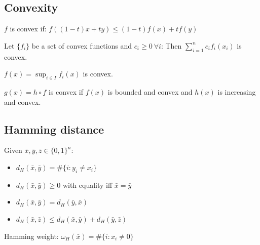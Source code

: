 \documentclass[10pt,a4paper,landscape]{article}
\begin{document}
\begin{multicols*}{4}
\subsection{Convexity}

$f$ is convex if: $f((1-t)x+ t y)\leq (1-t) f(x)+ t f(y)$

Let $\{f_i\}$ be a set of convex functions and $c_i \geq 0 \ \forall i$:
Then $\sum_{i=1}^n c_i f_i(x_i)$ is convex.

$f(x) = \sup_{i \in I} f_i(x)$ is convex.

$g(x) = h \circ f$ is convex if $f(x)$ is bounded and convex and $h(x)$ is increasing and convex.


\subsection{Hamming distance}
Given $\bar{x}, \bar{y}, \bar{z} \in \{0,1\}^n$:
\begin{itemize}
 \item $d_H(\bar{x},\bar{y}) = \#\{i:y_i \neq x_i\}$
 \item $d_H(\bar{x},\bar{y}) \geq 0$ with equality iff $\bar{x} = \bar{y}$
 \item $d_H(\bar{x},\bar{y}) = d_H(\bar{y},\bar{x})$
 \item $d_H(\bar{x},\bar{z}) \leq d_H(\bar{x},\bar{y}) + d_H(\bar{y},\bar{z})$
\end{itemize}
Hamming weight: $\omega_H(\bar{x}) = \#\{i: x_i \neq 0\}$

\end{multicols*}
\end{document}
